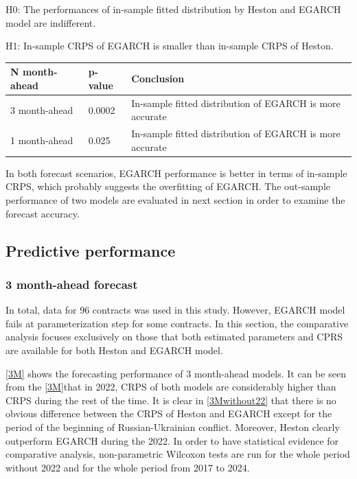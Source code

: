 \documentclass[12pt,a4paper]{article}
\newcommand\colorAutoref[1]{{\hypersetup{linkcolor=black}\autoref{#1}}}
\numberwithin{equation}{section}
\begin{document}
H0: The performances of in-sample fitted distribution by Heston and EGARCH model are indifferent.

H1:  In-sample CRPS of EGARCH is smaller than in-sample CRPS of Heston.

\begin{table}[h!]
\centering
\begin{tabular}{@{}lll@{}}
\toprule
N month-ahead     & p-value & Conclusion                     \\ \midrule
3 month-ahead     & 0.0002  & In-sample fitted distribution of EGARCH is more accurate \\
1 month-ahead     & 0.025    & In-sample fitted distribution of EGARCH is more accurate \\ \bottomrule
\end{tabular}
\end{table}

In both forecast scenarios, EGARCH performance is better in terms of in-sample CRPS, which probably suggests the overfitting of EGARCH. The out-sample performance of two models are evaluated in next section in order to examine the forecast accuracy.

\subsection{Predictive performance}

\subsubsection{3 month-ahead forecast}

 In total, data for 96 contracts was used in this study. However, EGARCH model fails at parameterization step for some contracts. In this section, the comparative analysis focuses exclusively on those that both estimated parameters and CPRS are available for both Heston and EGARCH model.
 
 \colorAutoref{3M} shows the forecasting performance of 3 month-ahead models. It can be seen from the \colorAutoref{3M}that in 2022, CRPS of both models are considerably higher than CRPS during the rest of the time. It is clear in \colorAutoref{3Mwithout22} that there is no obvious difference between the CRPS of Heston and EGARCH except for the period of the beginning of Russian-Ukrainian conflict. Moreover, Heston clearly outperform EGARCH during the 2022. In order to have statistical evidence for comparative analysis, non-parametric Wilcoxon tests are run for the whole period without 2022 and for the whole period from 2017 to 2024. 
 
\end{document}
